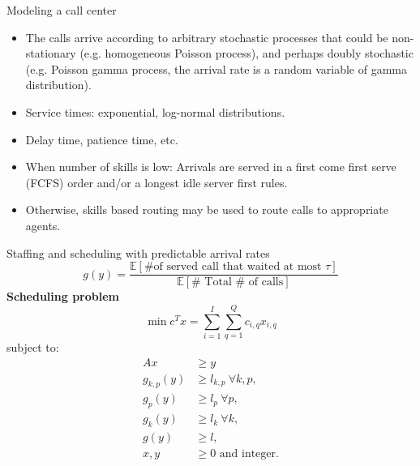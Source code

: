 \documentclass{beamer}
\begin{document}
\begin{frame}{Modeling a call center}
	\begin{itemize}
		\item{} The calls arrive according	to arbitrary stochastic processes that could be non-stationary (e.g. homogeneous Poisson process), and perhaps doubly stochastic (e.g. Poisson gamma process, the arrival rate is a random	variable of gamma distribution).
		\item{} Service times: exponential, log-normal distributions.
		\item{} Delay time,  patience time, etc.
		\item{} When number of skills is low: Arrivals are served in a first come first serve (FCFS) order and/or a longest idle server first rules. 
		\item{} Otherwise, {\color{blue}skills based routing} may be used to route calls to appropriate agents.
	\end{itemize}
\end{frame}

\begin{frame}{Staffing and scheduling with predictable arrival rates}
	\[
	g(y) = \frac{\mathbb{E}[\# \text{of served call that waited at most } \tau]}{\mathbb{E}[\# \text{ Total } \# \text{ of calls}]}
	\]
	\textbf{Scheduling problem}	
	\[
	\min {c}^T{x} = \sum_{i=1}^I\sum_{q=1}^Q c_{i,q}x_{i,q}
	\]
	subject to:
	\begin{equation} \tag{P1}
	\begin{aligned}
	{Ax} &\geq {y} \\
	g_{k,p}({y}) &\geq l_{k,p} ~\forall k,p, \\
	g_{p}({y}) &\geq l_{p} ~\forall p, \\
	g_{k}({y}) &\geq l_{k} ~\forall k, \\
	g(y) &\geq l,\\
	{x},{y}&\geq 0 \text{ and integer}  \text{.}\\
	\end{aligned}
	\end{equation}
\end{frame}
\end{document}
